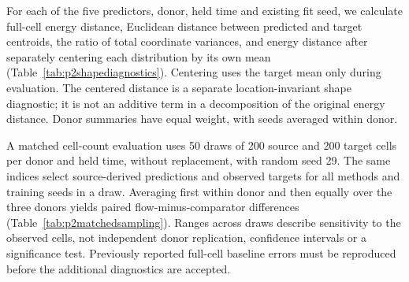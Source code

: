 For each of the five predictors, donor, held time and existing fit seed, we calculate full-cell energy distance, Euclidean distance between predicted and target centroids, the ratio of total coordinate variances, and energy distance after separately centering each distribution by its own mean (Table~\ref{tab:p2shapediagnostics}). Centering uses the target mean only during evaluation. The centered distance is a separate location-invariant shape diagnostic; it is not an additive term in a decomposition of the original energy distance. Donor summaries have equal weight, with seeds averaged within donor.

A matched cell-count evaluation uses 50 draws of 200 source and 200 target cells per donor and held time, without replacement, with random seed 29. The same indices select source-derived predictions and observed targets for all methods and training seeds in a draw. Averaging first within donor and then equally over the three donors yields paired flow-minus-comparator differences (Table~\ref{tab:p2matchedsampling}). Ranges across draws describe sensitivity to the observed cells, not independent donor replication, confidence intervals or a significance test. Previously reported full-cell baseline errors must be reproduced before the additional diagnostics are accepted.
